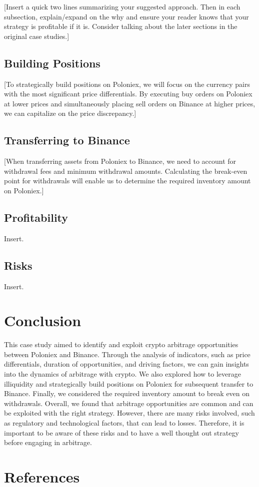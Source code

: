 \documentclass{article}
\begin{document}
[Insert a quick two lines summarizing your suggested approach. Then in each subsection, explain/expand on the why and ensure your reader knows that your strategy is profitable if it is. Consider talking about the later sections in the original case studies.]
\subsection{Building Positions}
[To strategically build positions on Poloniex, we will focus on the currency pairs with the most significant price differentials. By executing buy orders on Poloniex at lower prices and simultaneously placing sell orders on Binance at higher prices, we can capitalize on the price discrepancy.]
\subsection{Transferring to Binance}
[When transferring assets from Poloniex to Binance, we need to account for withdrawal fees and minimum
withdrawal amounts. Calculating the break-even point for withdrawals will enable us to determine the
required inventory amount on Poloniex.]
\subsection{Profitability}
Insert.
\subsection{Risks}
Insert.

\section{Conclusion}
This case study aimed to identify and exploit crypto arbitrage opportunities between Poloniex and Binance. Through the analysis of indicators, such as price differentials, duration of opportunities, and driving factors, we can gain insights into the dynamics of arbitrage with crypto. We also explored how to leverage illiquidity and strategically build positions on Poloniex for subsequent transfer to Binance. Finally, we considered the required inventory amount to break even on withdrawals. Overall, we found that arbitrage opportunities are common and can be exploited with the right strategy. However, there are many risks involved, such as regulatory and technological factors, that can lead to losses. Therefore, it is important to be aware of these risks and to have a well thought out strategy before engaging in arbitrage.

\section{References}
\end{document}
